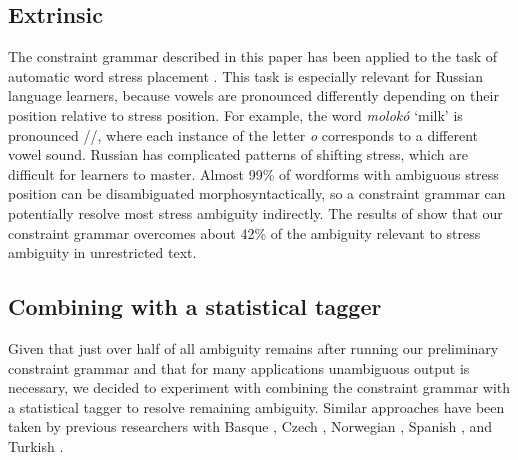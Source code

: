 \documentclass[11pt]{article}
\begin{document}



\subsection{Extrinsic}

The constraint grammar described in this paper has been applied to the task of automatic
word stress placement \cite{reynolds.tyers-15}. This task is especially relevant for 
Russian language learners, because vowels are pronounced differently depending on their position 
relative to stress position. For example, the word \emph{molokó} `milk' is pronounced 
//, where each instance of the letter \emph{o} corresponds to a different vowel sound. 
Russian has complicated patterns of shifting stress, which are difficult for learners to master.
Almost 99\% of wordforms with ambiguous stress position can be disambiguated morphosyntactically,
so a constraint grammar can potentially resolve most stress ambiguity indirectly. The results of  show that our constraint grammar overcomes about 42\% of the ambiguity relevant to stress
ambiguity in unrestricted text.

\subsection{Combining with a statistical tagger}

Given that just over half of all ambiguity remains after running our preliminary constraint
grammar and that for many applications unambiguous output is necessary, we decided to 
experiment with combining the constraint grammar with a statistical tagger to resolve remaining
ambiguity. Similar approaches have been taken by previous researchers with Basque \cite{ezeiza.ea-98}, Czech \cite{hajic.ea-01,hajic.ea-07}, Norwegian \cite{johannessen.ea-11,johannessen.ea-12}, Spanish \cite{hulden12}, and Turkish \cite{oflazer.tur-96}. 
\end{document}
